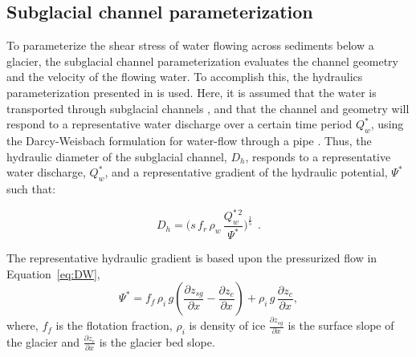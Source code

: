 \documentclass[11pt]{article}
\begin{document}
\begin{spacing}{1}
  \subsection{Subglacial channel  parameterization}
  \label{sect:sub_mode}
  To parameterize the shear stress of water flowing across sediments below a glacier, the subglacial channel parameterization evaluates the channel geometry and the velocity of the flowing water. 
  To accomplish this, the hydraulics parameterization presented in \citet{delaney2019} is used. Here, it is assumed that the water is transported through subglacial channels \citep[Figure~\ref{fig:cartoon}; ][]{rothlisberger1972}, and that the channel  and geometry will respond to a representative water discharge over a certain time period $Q_{w}^*$, using the Darcy-Weisbach formulation for water-flow through a pipe  \citep[e.g.][]{rothlisberger1972,clarke2003,werder2013}.
  Thus, the hydraulic diameter of the subglacial channel, $D_h$, responds to a representative water discharge, $Q_{w}^*$, and a representative gradient of the hydraulic potential, $\Psi^*$ such that:
  \begin{linenomath*}
    \begin{equation}
      \label{eq:DW}
      D_h = \big(s\, f_r\,\rho_w\, \frac{Q_w^{*\,2}}{\Psi^*}\big)^{\frac{1}{5}}~~.
    \end{equation}
  \end{linenomath*}
  The representative hydraulic gradient is based upon the pressurized flow in Equation~\ref{eq:DW},
  \begin{equation}
    \label{eq:psi}
    \Psi^*= f_f \,  \rho_i \, g (\frac{\partial  z_{sg}}{\partial x} - \frac{\partial z_c}{\partial x}) +  \rho_i \, g \, \frac{\partial z_c}{\partial x},
  \end{equation}
  \noindent
  where, $f_f$ is the flotation fraction, $\rho_i$ is density of ice $\frac{\partial z_{sg}}{\partial x}$ is the surface slope of the glacier and $\frac{\partial z_c}{\partial x}$ is the glacier bed slope.
  

\end{spacing}
\end{document}
